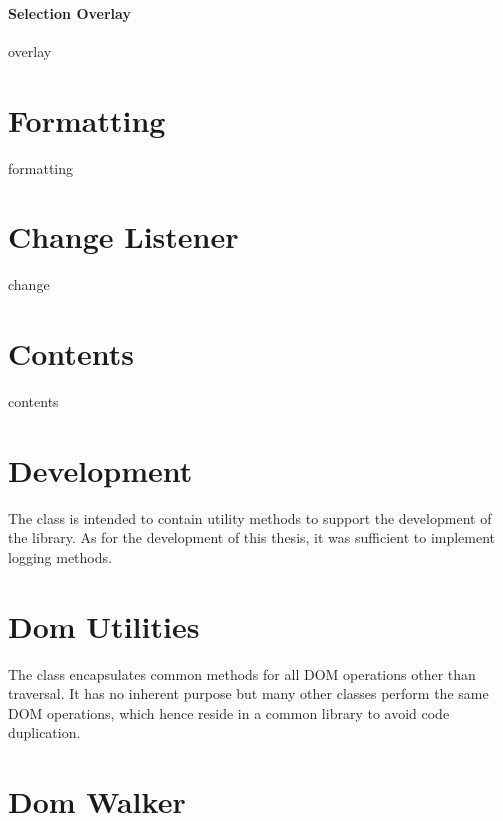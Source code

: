 \paragraph{Selection Overlay}
overlay

\section{Formatting}
formatting

\section{Change Listener}
change

\section{Contents}
contents

\section{Development}

The  class is intended to contain utility methods to support the development of the library. As for the development of this thesis, it was sufficient to implement logging methods.

\section{Dom Utilities}

The  class encapsulates common methods for all DOM operations other than traversal. It has no inherent purpose but many other classes perform the same DOM operations, which hence reside in a common library to avoid code duplication.

\section{Dom Walker}

